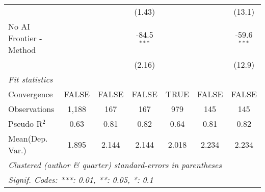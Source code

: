 \begin{tabular}{lcccccc}
                           &              &               & (1.43)        &              &              & (13.1)\\   
   No AI Frontier - Method &              &               & -84.5$^{***}$ &              &              & -59.6$^{***}$\\   
                           &              &               & (2.16)        &              &              & (12.9)\\   
   \midrule
   \emph{Fit statistics}\\
   Convergence             &FALSE         & FALSE         & FALSE         & TRUE         & FALSE        & FALSE\\  
   Observations            & 1,188        & 167           & 167           & 979          & 145          & 145\\  
   Pseudo R$^2$            & 0.63         & 0.81          & 0.82          & 0.64         & 0.81         & 0.82\\  
Mean(Dep. Var.) & 1.895 & 2.144 & 2.144 & 2.018 & 2.234 & 2.234 \\
   \midrule \midrule
   \multicolumn{7}{l}{\emph{Clustered (author \& quarter) standard-errors in parentheses}}\\
   \multicolumn{7}{l}{\emph{Signif. Codes: ***: 0.01, **: 0.05, *: 0.1}}\\
\end{tabular}
\par\endgroup
